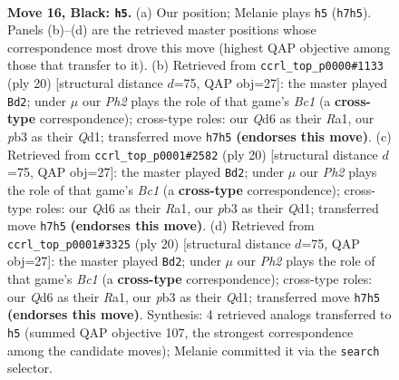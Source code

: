 \documentclass[11pt]{article}
\begin{document}
\clearpage

\begin{figure}[p]\centering
\begin{subfigure}{0.46\textwidth}\centering
\resizebox{\linewidth}{!}{%
\newchessgame
\chessboard[
  setfen={rnbr2k1/1p2bppp/pn1qp3/8/3p2N1/1Pp3P1/P3PPBP/RNBQRK2 b - - 1 16},
  showmover=false,
  pgfstyle=straightmove, color=movearrow, markmove={h7-h5}
]}
\caption{}
\end{subfigure}\hfill
\begin{subfigure}{0.46\textwidth}\centering
\resizebox{\linewidth}{!}{%
\newchessgame
\chessboard[
  setfen={r1bq1rk1/2ppnpbp/p5p1/np1P4/4P3/1B3N2/PP3PPP/RNBQ1RK1 w - - 1 11},
  showmover=false,
  pgfstyle=straightmove, color=movearrow, markmove={c1-d2}
]}
\caption{}
\end{subfigure}
\\[4pt]
\begin{subfigure}{0.46\textwidth}\centering
\resizebox{\linewidth}{!}{%
\newchessgame
\chessboard[
  setfen={r1bq1rk1/2ppnpbp/p5p1/np1P4/4P3/1B3N2/PP3PPP/RNBQ1RK1 w - - 1 11},
  showmover=false,
  pgfstyle=straightmove, color=movearrow, markmove={c1-d2}
]}
\caption{}
\end{subfigure}\hfill
\begin{subfigure}{0.46\textwidth}\centering
\resizebox{\linewidth}{!}{%
\newchessgame
\chessboard[
  setfen={r1bq1rk1/2ppnpbp/p5p1/np1P4/4P3/1B3N2/PP3PPP/RNBQ1RK1 w - - 1 11},
  showmover=false,
  pgfstyle=straightmove, color=movearrow, markmove={c1-d2}
]}
\caption{}
\end{subfigure}
\caption{\textbf{Move 16, Black: \texttt{h5}.} (a) Our position; Melanie plays \texttt{h5} (\texttt{h7h5}). Panels (b)--(d) are the retrieved master positions whose correspondence most drove this move (highest QAP objective among those that transfer to it). (b) Retrieved from \texttt{ccrl\_top\_p0000\#1133} (ply 20) [structural distance $d$=75, QAP obj=27]: the master played \texttt{Bd2}; under $\mu$ our \emph{Ph2} plays the role of that game's \emph{Bc1} (a \textbf{cross-type} correspondence); cross-type roles: our \emph{Q}d6 as their \emph{R}a1, our \emph{p}b3 as their \emph{Q}d1; transferred move \texttt{h7h5} \textbf{(endorses this move)}. (c) Retrieved from \texttt{ccrl\_top\_p0001\#2582} (ply 20) [structural distance $d$=75, QAP obj=27]: the master played \texttt{Bd2}; under $\mu$ our \emph{Ph2} plays the role of that game's \emph{Bc1} (a \textbf{cross-type} correspondence); cross-type roles: our \emph{Q}d6 as their \emph{R}a1, our \emph{p}b3 as their \emph{Q}d1; transferred move \texttt{h7h5} \textbf{(endorses this move)}. (d) Retrieved from \texttt{ccrl\_top\_p0001\#3325} (ply 20) [structural distance $d$=75, QAP obj=27]: the master played \texttt{Bd2}; under $\mu$ our \emph{Ph2} plays the role of that game's \emph{Bc1} (a \textbf{cross-type} correspondence); cross-type roles: our \emph{Q}d6 as their \emph{R}a1, our \emph{p}b3 as their \emph{Q}d1; transferred move \texttt{h7h5} \textbf{(endorses this move)}. Synthesis: 4 retrieved analogs transferred to \texttt{h5} (summed QAP objective 107, the strongest correspondence among the candidate moves); Melanie committed it via the \texttt{search} selector.}
\label{fig:thought-m31}
\end{figure}
\end{document}
